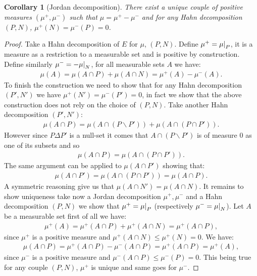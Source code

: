 \documentclass[11pt,a4paper]{article}
\newcommand\restr[2]{{%
  \left.\kern-\nulldelimiterspace %
  #1 %
  \littletaller %
  \right|_{#2} %
  }}
\newcommand{\littletaller}{\mathchoice{\vphantom{\big|}}{}{}{}}
\newtheorem{corollary}[theorem]{Corollary}
\begin{document}
\begin{corollary}[Jordan decomposition]
    There exist a unique couple of positive measures $(\mu^+,\mu^-)$ such that $\mu = \mu^+ - \mu^-$ and for any Hahn decomposition $(P,N)$, $\mu^+(N) = \mu^-(P) = 0$.
\end{corollary}
\begin{proof}
    Take a Hahn decomposition of $E$ for $\mu$, $(P,N)$. Define $\mu^+ = \restr{\mu}{P}$, it is a measure as a restriction to a measurable set and is positive by construction. Define similarly $\mu^-= - \restr{\mu}{N}$, for all measurable sets $A$ we have:
    \begin{align*}
        \mu(A) = \mu(A\cap P) + \mu(A\cap N) =  \mu^+(A) - \mu^-(A).
    \end{align*}
    To finish the construction we need to show that for any Hahn decomposition $(P',N')$ we have $\mu^+(N') = \mu^-(P') = 0$, in fact we show that the above construction does not rely on the choice of $(P,N)$. Take another Hahn decomposition $(P',N')$:
    \begin{align*}
        \mu(A\cap P) = \mu(A\cap (P\backslash P')) + \mu(A\cap (P\cap P')).
    \end{align*}
    However since $P\Delta P'$ is a null-set it comes that $A\cap (P\backslash P')$ is of measure $0$ as one of its subsets and so
    \begin{align*}
        \mu(A\cap P) =\mu(A\cap (P\cap P')).
    \end{align*}
    The same argument can be applied to $\mu(A\cap P')$ showing that:
    \begin{align*}
        \mu(A\cap P') =\mu(A\cap (P\cap P')) = \mu(A\cap P).
    \end{align*}
    A symmetric reasoning give us that $\mu(A\cap N') = \mu(A\cap N)$. It remains to show uniqueness take now a Jordan decomposition $\mu^+,\mu^-$ and a Hahn decomposition $(P,N)$ we show that $\mu^+ = \restr{\mu}{P}$ (respectively $\mu^- = \restr{\mu}{N}$). Let $A$ be a measurable set first of all we have:
    \begin{align*}
        \mu^+(A) = \mu^+(A\cap P) + \mu^+(A\cap N) = \mu^+(A\cap P),
    \end{align*}
    since $\mu^+$ is a positive measure and $\mu^+(A\cap N) \leq \mu^+(N) = 0$. We have:
    \begin{align*}
        \mu(A\cap P) = \mu^+(A\cap P) - \mu^-(A\cap P) = \mu^+(A\cap P)= \mu^+(A), 
    \end{align*}
    since $\mu^-$ is a positive measure and $\mu^-(A\cap P) \leq \mu^-(P) = 0$. This being true for any couple $(P,N)$, $\mu^+$ is unique and same goes for $\mu^-$.
\end{proof}
\end{document}
